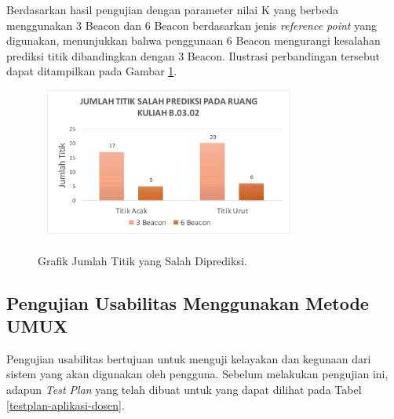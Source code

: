\begin{enumerate}
	      \par Berdasarkan hasil pengujian dengan parameter nilai K yang berbeda menggunakan 3 Beacon dan 6 Beacon berdasarkan jenis \textit{reference point} yang digunakan, menunjukkan bahwa penggunaan 6 Beacon mengurangi kesalahan prediksi titik dibandingkan dengan 3 Beacon. Ilustrasi perbandingan tersebut dapat ditampilkan pada Gambar \ref{gambar-grafik-titik-salah-prediksi}.
	      \begin{figure}[H]
		      \center
		      \shadowbox
		      {\includegraphics [width = 9cm, height= 5cm]{gambar/pengujian/grafik-titik-salah-prediksi}}
		      \caption{Grafik Jumlah Titik yang Salah Diprediksi.}
		      \label{gambar-grafik-titik-salah-prediksi}
	      \end{figure}


\end{enumerate}

\subsection{Pengujian Usabilitas Menggunakan Metode UMUX}
\par Pengujian usabilitas bertujuan untuk menguji kelayakan dan kegunaan dari sistem yang akan digunakan oleh pengguna. Sebelum melakukan pengujian ini, adapun \textit{Test Plan} yang telah dibuat untuk yang dapat dilihat pada Tabel \ref{testplan-aplikasi-dosen}.

